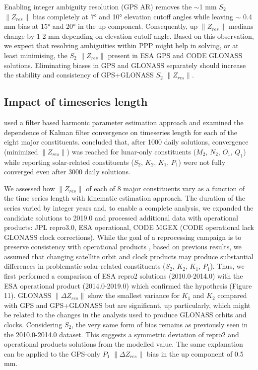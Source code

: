 \documentclass[se, manuscript]{copernicus}
\begin{document}
Enabling integer ambiguity resolution (GPS AR) removes the $\sim$1 mm $S_2$ $\|Z_{res}\|$ bias completely at 7° and 10° elevation cutoff angles while leaving $\sim$ 0.4 mm bias at 15° and 20° in the up component. Consequently, up $\|Z_{res}\|$ medians change by 1-2 mm depending on elevation cutoff angle. Based on this observation, we expect that resolving ambiguities within PPP might help in solving, or at least minimising, the $S_2$ $\|Z_{res}\|$ present in ESA GPS and CODE GLONASS solutions. Eliminating biases in GPS and GLONASS separately should increase the stability and consistency of GPS+GLONASS $S_2$ $\|Z_{res}\|$.

\subsection{Impact of timeseries length}
\cite{Yuan2013} used a filter based harmonic parameter estimation approach and examined the dependence of Kalman filter convergence on timeseries length for each of the eight major constituents. \cite{Yuan2013} concluded that, after 1000 daily solutions, convergence (minimized $\|Z_{res}\|$) was reached for lunar-only constituents ($M_2$, $N_2$, $O_1$, $Q_1$) while reporting solar-related constituents ($S_2$, $K_2$, $K_1$, $P_1$) were not fully converged even after 3000 daily solutions.

We assessed how $\|Z_{res}\|$ of each of 8 major constituents vary as a function of the time series length with kinematic estimation approach. The duration of the series varied by integer years and, to enable a complete analysis, we expanded the candidate solutions to 2019.0 and processed additional data with operational products: JPL repro3.0, ESA operational, CODE MGEX (CODE operational lack GLONASS clock corrections). While the goal of a reprocessing campaign is to preserve consistency with operational products \citep{Griffiths2019}, based on previous results, we assumed that changing satellite orbit and clock products may produce substantial differences in problematic solar-related constituents ($S_2$, $K_2$, $K_1$, $P_1$). Thus, we first performed a comparison of ESA repro2 solutions (2010.0-2014.0) with the ESA operational product (2014.0-2019.0) which confirmed the hypothesis (Figure 11). GLONASS $\|\Delta Z_{res}\|$ show the smallest variance for $K_1$ and $K_2$ compared with GPS and GPS+GLONASS but are significant, up particularly, which might be related to the changes in the analysis used to produce GLONASS orbits and clocks. Considering $S_2$, the very same form of bias remains as previously seen in the 2010.0-2014.0 dataset. This suggests a symmetric deviation of repro2 and operational products solutions from the modelled value. The same explanation can be applied to the GPS-only $P_1$ $\|\Delta Z_{res}\|$ bias in the up component of 0.5 mm.
\end{document}
